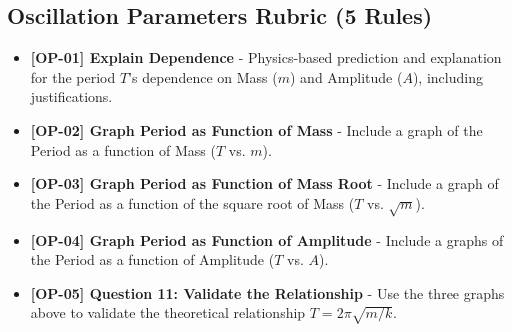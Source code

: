 \documentclass{article}
\begin{document}
\subsection*{Oscillation Parameters Rubric (5 Rules)}
\begin{itemize}
\item \textbf{ [OP-01] Explain Dependence } - Physics-based prediction and explanation for the period $T$'s dependence on Mass ($m$) and Amplitude ($A$), including justifications.
\item \textbf{ [OP-02] Graph Period as Function of Mass } - Include a graph of the Period as a function of Mass ($T$ vs. $m$).
\item \textbf{ [OP-03] Graph Period as Function of Mass Root } - Include a graph of the Period as a function of the square root of Mass ($T$ vs. $\sqrt{m}$).
\item \textbf{ [OP-04] Graph Period as Function of Amplitude } - Include a graphs of the Period as a function of Amplitude ($T$ vs. $A$).
\item \textbf{ [OP-05] Question 11: Validate the Relationship } - Use the three graphs above to validate the theoretical relationship $T = 2\pi\sqrt{m/k}$.    
\end{itemize}
\end{document}
